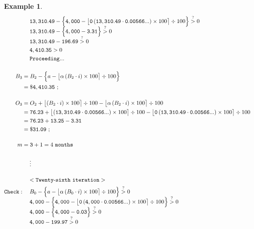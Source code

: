 \documentclass[12pt,letterpaper,oneside]{article}
\newtheorem{example}{Example}[section]
\theoremstyle{remark} %
\begin{document}
\begin{example}
\begin{align*}
	&\quad\;\mathtt{\balanceitc}-\Big\{\mathtt{\amount}-\big\lfloor{\mathtt{\proportion}\left(\mathtt{\balanceitc}\cdot \mathtt{\rate}\right)\times 100}\big\rceil\div 100\Big\}\overset{?}{>}0\\[-6pt]
	&\quad\;\mathtt{\balanceitc}-\Big\{\mathtt{\amount}-\mathtt{3.31}\Big\}\overset{?}{>}0\\[-6pt]
	&\quad\;\mathtt{\balanceitc}-\mathtt{196.69}\overset{?}{>}0\\
	&\quad\;\mathtt{4,410.35}>0\\
	&\quad\;\mathtt{Proceeding...}\\[12pt]
	B_{\monthspitc}&=B_{\monthsitc}-\Big\{a-\big\lfloor{\alpha\left(B_{\monthsitc}\cdot i\right)\times 100}\big\rceil\div 100\Big\}\\
	&=\mathtt{\$4,410.35}\ ;\\[12pt]
	O_{\monthspitc}&=O_{\monthsitc}+\big\lfloor{\left(B_{\monthsitc}\cdot i\right)\times 100}\big\rceil\div 100-\big\lfloor{\alpha\left(B_{\monthsitc}\cdot i\right)\times 100}\big\rceil\div 100\\
	&=\mathtt{\interestitc}+\big\lfloor{\left(\mathtt{\balanceitc}\cdot \mathtt{\rate}\right)\times 100}\big\rceil\div 100-\big\lfloor{\mathtt{\proportion}\left(\mathtt{\balanceitc}\cdot \mathtt{\rate}\right)\times 100}\big\rceil\div 100\\
	&=\mathtt{\interestitc}+\mathtt{13.25}-\mathtt{3.31}\\
	&=\mathtt{\$31.09}\ ;\\[12pt]
	m&=\mathtt{\monthspitc}+1=4\mathtt{\ months}\\[12pt]
	&\quad\;\vdots\\[12pt]
	&\quad\;\mathtt{<Twenty}\mbox{-}\mathtt{sixth\ iteration>}\\
	\mathtt{Check:}&\quad\;B_{\monthsitf}-\Big\{a-\big\lfloor{\alpha\left(B_{\monthsitf}\cdot i\right)\times 100}\big\rceil\div 100\Big\}\overset{?}{>}0\\[-6pt]
	&\quad\;\mathtt{\balanceitf}-\Big\{\mathtt{\amount}-\big\lfloor{\mathtt{\proportion}\left(\mathtt{\balanceitf}\cdot \mathtt{\rate}\right)\times 100}\big\rceil\div 100\Big\}\overset{?}{>}0\\[-6pt]
	&\quad\;\mathtt{\balanceitf}-\Big\{\mathtt{\amount}-\mathtt{0.03}\Big\}\overset{?}{>}0\\[-6pt]
	&\quad\;\mathtt{\balanceitf}-\mathtt{199.97}\overset{?}{>}0\\

\end{align*}
\end{example}
\end{document}
